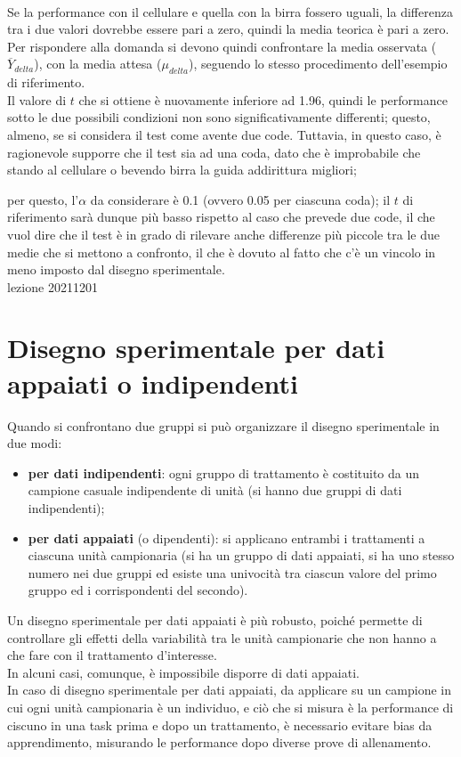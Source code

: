 \documentclass[10pt, draft]{book}
\newcommand{\tightlist}{%
\setlength{\itemsep}{1pt}\setlength{\parskip}{0pt}\setlength{\parsep}{0pt}}
\begin{document}
\\
Se la performance con il cellulare e quella con la birra fossero uguali, la differenza tra i due valori dovrebbe essere pari a zero, quindi la media teorica è pari a zero.
\\
Per rispondere alla domanda si devono quindi confrontare la media osservata ($\overline{Y}_{delta}$), con la media attesa ($\mu_{delta}$), seguendo lo stesso procedimento dell'esempio di riferimento.
\\
Il valore di $t$ che si ottiene è nuovamente inferiore ad 1.96, quindi le performance sotto le due possibili condizioni non sono significativamente differenti; questo, almeno, se si considera il test come avente due code. Tuttavia, in questo caso, è ragionevole supporre che il test sia ad una coda, dato che è improbabile che stando al cellulare o bevendo birra la guida addirittura migliori; \colorbox{lyellow}{\parbox{0.98\textwidth}{per questo, l'$\alpha$ da considerare è 0.1 (ovvero 0.05 per ciascuna coda); il $t$ di riferimento sarà dunque più basso rispetto al caso che prevede due code, il che vuol dire che il test è in grado di rilevare anche differenze più piccole tra le due medie che si mettono a confronto, il che è dovuto al fatto che c'è un vincolo in meno imposto dal disegno sperimentale.
\\
lezione 20211201}}

\section{Disegno sperimentale per dati appaiati o indipendenti}

Quando si confrontano due gruppi si può organizzare il disegno sperimentale in due modi:
\begin{itemize} \tightlist
    \item \textbf{per dati indipendenti}: ogni gruppo di trattamento è costituito da un campione casuale indipendente di unità (si hanno due gruppi di dati indipendenti);
    \item \textbf{per dati appaiati} (o dipendenti): si applicano entrambi i trattamenti a ciascuna unità campionaria (si ha un gruppo di dati appaiati, si ha uno stesso numero nei due gruppi ed esiste una univocità tra ciascun valore del primo gruppo ed i corrispondenti del secondo).
\end{itemize}
Un disegno sperimentale per dati appaiati è più robusto, poiché permette di controllare gli effetti della variabilità tra le unità campionarie che non hanno a che fare con il trattamento d'interesse.
\\
In alcuni casi, comunque, è impossibile disporre di dati appaiati.
\\
In caso di disegno sperimentale per dati appaiati, da applicare su un campione in cui ogni unità campionaria è un individuo, e ciò che si misura è la performance di ciscuno in una task prima e dopo un trattamento, è necessario evitare bias da apprendimento, misurando le performance dopo diverse prove di allenamento.
\end{document}
